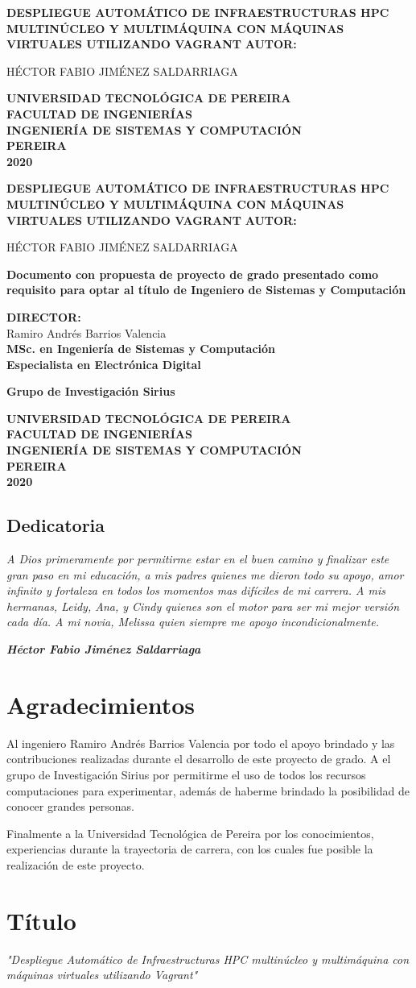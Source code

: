 \documentclass[letterpaper, 12pt, oneside]{article}
\newcommand\portada{
    \begin{titlepage}
		\begin{center}
			{\large \bf DESPLIEGUE AUTOMÁTICO DE INFRAESTRUCTURAS HPC MULTINÚCLEO Y MULTIMÁQUINA CON MÁQUINAS VIRTUALES UTILIZANDO VAGRANT }
			\vfill
  			{\large\bf AUTOR:} \\
			{\large HÉCTOR FABIO JIMÉNEZ SALDARRIAGA \par}
			\vfill
			{\large\bf UNIVERSIDAD TECNOLÓGICA DE PEREIRA} \\
			{\large\bf FACULTAD DE INGENIERÍAS} \\
			{\large\bf INGENIERÍA DE SISTEMAS Y COMPUTACIÓN} \\
			{\large\bf PEREIRA} \\
			{\large\bf 2020}
		\end{center}
	\end{titlepage}
}
\newcommand\contraportada{
\begin{titlepage}
		\begin{center}
			{\large \bf DESPLIEGUE AUTOMÁTICO DE INFRAESTRUCTURAS HPC MULTINÚCLEO Y MULTIMÁQUINA CON MÁQUINAS VIRTUALES UTILIZANDO VAGRANT }
			\vfill
			{\large\bf AUTOR:} \\
			{\large HÉCTOR FABIO JIMÉNEZ SALDARRIAGA\par}
			\vfill
			{\large\bf Documento con propuesta de proyecto de grado presentado como requisito para optar al título de Ingeniero de Sistemas y Computación\par}
			\vfill
			{\large\bf DIRECTOR:} \\
			{\large Ramiro Andrés Barrios Valencia} \\
			{\large\bf MSc. en Ingeniería de Sistemas y Computación} \\
			{\large\bf Especialista en Electrónica Digital} \\
			{\large\bf Grupo de Investigación Sirius\par}
			\vfill
			{\large\bf UNIVERSIDAD TECNOLÓGICA DE PEREIRA} \\
			{\large\bf FACULTAD DE INGENIERÍAS} \\
			{\large\bf INGENIERÍA DE SISTEMAS Y COMPUTACIÓN} \\
			{\large\bf PEREIRA} \\
			{\large\bf 2020}
		\end{center}
	\end{titlepage}
}
\begin{document}
\portada
\contraportada
\newpage
	\clearpage
    \begin{center}
    \thispagestyle{empty}
    \vspace*{\fill}
    \section*{Dedicatoria}
    \textit{A Dios primeramente por permitirme estar en el buen camino y finalizar este gran paso en mi educación, a mis padres quienes me dieron todo su apoyo, amor infinito y fortaleza en todos los momentos mas difíciles de mi carrera. A mis hermanas, Leidy, Ana, y Cindy quienes son el motor para ser mi mejor versión cada día. A mi novia, Melissa quien siempre me apoyo incondicionalmente.}
    \begin{flushright}
    \textit{\textbf{Héctor Fabio Jiménez Saldarriaga}}
    \end{flushright}
    
    \vspace*{\fill}
    \end{center}
      \clearpage
    \newpage
	\section*{Agradecimientos}
	
    Al ingeniero Ramiro Andrés Barrios Valencia por todo el apoyo brindado y las contribuciones realizadas durante el desarrollo de este proyecto de grado. A el grupo de Investigación Sirius por permitirme el uso de todos los recursos computaciones para experimentar, además de haberme brindado la posibilidad de conocer grandes personas. 
    
    Finalmente a la Universidad Tecnológica de Pereira por los conocimientos, experiencias durante la trayectoria de carrera, con los cuales fue posible la realización de este proyecto. 
\clearpage
\newpage
	\renewcommand{\tablename}{Tabla}
	\renewcommand{\contentsname}{\centering Contenido}
	\tableofcontents
	\newpage
	\renewcommand{\listfigurename}{Lista de Figuras}
    \listoffigures
    \newpage
    \renewcommand{\listtablename}{Lista de Tablas }
    \listoftables
	\clearpage
	
	\section{Título}
	\textit{"Despliegue Automático de Infraestructuras HPC multinúcleo y multimáquina con máquinas virtuales utilizando Vagrant"}
\end{document}
